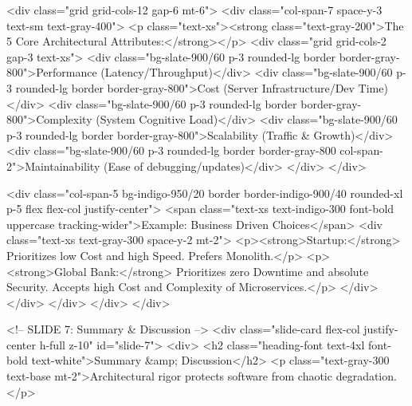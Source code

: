                     <div class="grid grid-cols-12 gap-6 mt-6">
                        <div class="col-span-7 space-y-3 text-sm text-gray-400">
                            <p class="text-xs"><strong class="text-gray-200">The 5 Core Architectural Attributes:</strong></p>
                            <div class="grid grid-cols-2 gap-3 text-xs">
                                <div class="bg-slate-900/60 p-3 rounded-lg border border-gray-800">Performance (Latency/Throughput)</div>
                                <div class="bg-slate-900/60 p-3 rounded-lg border border-gray-800">Cost (Server Infrastructure/Dev Time)</div>
                                <div class="bg-slate-900/60 p-3 rounded-lg border border-gray-800">Complexity (System Cognitive Load)</div>
                                <div class="bg-slate-900/60 p-3 rounded-lg border border-gray-800">Scalability (Traffic & Growth)</div>
                                <div class="bg-slate-900/60 p-3 rounded-lg border border-gray-800 col-span-2">Maintainability (Ease of debugging/updates)</div>
                            </div>
                        </div>
                        
                        <div class="col-span-5 bg-indigo-950/20 border border-indigo-900/40 rounded-xl p-5 flex flex-col justify-center">
                            <span class="text-xs text-indigo-300 font-bold uppercase tracking-wider">Example: Business Driven Choices</span>
                            <div class="text-xs text-gray-300 space-y-2 mt-2">
                                <p><strong>Startup:</strong> Prioritizes low Cost and high Speed. Prefers Monolith.</p>
                                <p><strong>Global Bank:</strong> Prioritizes zero Downtime and absolute Security. Accepts high Cost and Complexity of Microservices.</p>
                            </div>
                        </div>
                    </div>
                </div>
            </div>

            <!-- SLIDE 7: Summary & Discussion -->
            <div class="slide-card flex-col justify-center h-full z-10" id="slide-7">
                <div>
                    <h2 class="heading-font text-4xl font-bold text-white">Summary &amp; Discussion</h2>
                    <p class="text-gray-300 text-base mt-2">Architectural rigor protects software from chaotic degradation.</p>
                    
